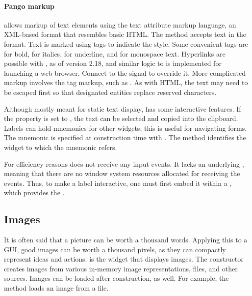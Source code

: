 \paragraph{Pango markup}
\GTK\/ allows markup of text elements using the  text attribute
markup language, an XML-based format that resembles basic HTML. The
method  accepts text in the format. Text
is marked using tags to indicate the style. Some convenient tags are
 for bold,  for italics,  for
underline, and  for monospace text. Hyperlinks are possible
with , as of version 2.18, and similar logic to
 is implemented for launching a web
browser. Connect to the  signal to
override it. More complicated markup involves the  tag
markup, such as . As with
HTML, the text may need to be escaped first so that designated
entities replace reserved characters.

Although mostly meant for static text display,  has
some interactive features. If the  property is set to
, the text can be selected and copied into the clipboard.
Labels can hold mnemonics for other widgets; this is useful for
navigating forms. The mnemonic is specified at construction time with
. The
 method identifies the widget to
which the mnemonic refers.

For efficiency reasons  does not receive any input
events. It lacks an underlying , meaning that there
are no window system resources allocated for receiving the
events. Thus, to make a label interactive, one must first embed it
within a , which provides the .

\subsection{Images}
\label{sec:RGtk2:images}

It is often said that a picture can be worth a thousand
words. Applying this to a GUI, good images can be worth a thousand
pixels, as they can compactly represent ideas and actions.  is the widget that
displays images. The constructor  creates images
from various in-memory image representations, files, and other
sources.  Images can be loaded after construction, as well. For
example, the  method loads an image from
a file.

